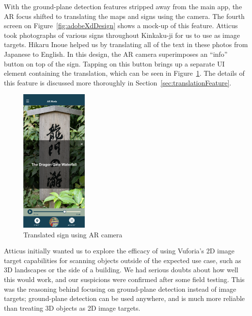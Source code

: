 \documentclass[a4paper, 10pt, american, titlepage]{article}
\begin{document}
With the ground-plane detection features stripped away from the main app, the
AR focus shifted to translating the maps and signs using the camera. The fourth
screen on Figure~\ref{fig:adobeXdDesign} shows a mock-up of this feature.
Atticus took photographs of various signs throughout Kinkaku-ji for us to use
as image targets. Hikaru Inoue helped us by translating all of the text in
these photos from Japanese to English. In this design, the AR camera
superimposes an ``info'' button on top of the sign. Tapping on this button
brings up a separate UI element containing the translation, which can be seen
in Figure~\ref{fig:signTranslation}. The details of this feature is discussed
more thoroughly in Section~\ref{sec:translationFeature}.

\begin{figure}[h] \centering
    \includegraphics[width=0.3\textwidth]{sign-translation.png}
    \caption{Translated sign using AR camera}
    \label{fig:signTranslation}
\end{figure}

Atticus initially wanted us to explore the efficacy of using Vuforia's 2D image
target capabilities for scanning objects outside of the expected use case, such
as 3D landscapes or the side of a building. We had serious doubts about how
well this would work, and our suspicions were confirmed after some field
testing. This was the reasoning behind focusing on ground-plane detection
instead of image targets; ground-plane detection can be used anywhere, and is
much more reliable than treating 3D objects as 2D image targets.
\end{document}
